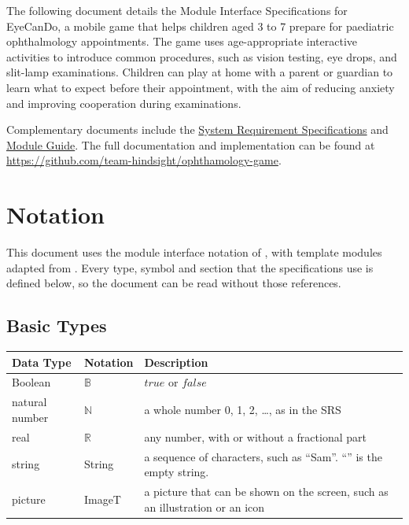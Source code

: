 \documentclass[10pt, titlepage]{article}
\newcommand{\srsurl}{https://team-hindsight.github.io/ophthamology-game/SRS/SRS.pdf}
\newcommand{\B}{\mathbb{B}}
\newcommand{\N}{\mathbb{N}}
\newcommand{\R}{\mathbb{R}}
\newcommand{\true}{\mathit{true}}
\newcommand{\false}{\mathit{false}}
\begin{document}
The following document details the Module Interface Specifications for
EyeCanDo, a mobile game that helps children aged 3 to 7 prepare for paediatric
ophthalmology appointments. The game uses age-appropriate interactive activities
to introduce common procedures, such as vision testing, eye drops, and slit-lamp
examinations. Children can play at home with a parent or guardian to learn what
to expect before their appointment, with the aim of reducing anxiety and
improving cooperation during examinations.

Complementary documents include the
\href{\srsurl}{System Requirement Specifications}
and \href{https://team-hindsight.github.io/ophthamology-game/Design/SoftArchitecture/MG.pdf}{Module Guide}.
The full documentation and implementation can be found at
\url{https://github.com/team-hindsight/ophthamology-game}.

\newpage
\section{Notation}\label{SecNotation}

This document uses the module interface notation of \cite{HoffmanAndStrooper1995},
with template modules adapted from \cite{GhezziEtAl2003}. Every type, symbol
and section that the specifications use is defined below, so the document can
be read without those references.

\subsection{Basic Types}

\begin{center}
\renewcommand{\arraystretch}{1.2}
\begin{tabular}{l l p{8cm}}
\toprule
\textbf{Data Type} & \textbf{Notation} & \textbf{Description}\\
\midrule
Boolean & $\B$ & $\true$ or $\false$\\
natural number & $\N$ & a whole number 0, 1, 2, \ldots, as in the SRS\\
real & $\R$ & any number, with or without a fractional part\\
string & String & a sequence of characters, such as ``Sam''. ``'' is the empty
string.\\
picture & ImageT & a picture that can be shown on the screen, such as an
illustration or an icon\\
\bottomrule
\end{tabular}
\end{center}
\end{document}
